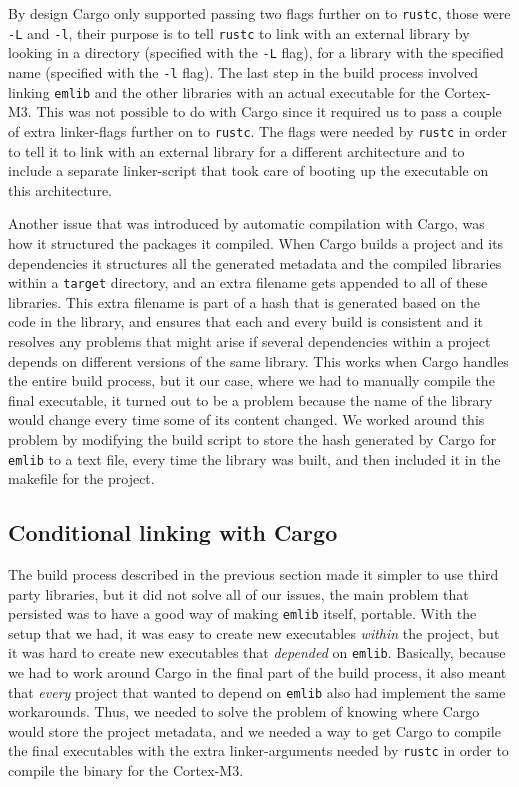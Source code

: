 By design Cargo only supported passing two flags further on to \texttt{rustc}, those were \texttt{-L} and \texttt{-l}, their purpose is to tell \texttt{rustc} to link with an external library by looking in a directory (specified with the \texttt{-L} flag), for a library with the specified name (specified with the \texttt{-l} flag).
The last step in the build process involved linking \texttt{emlib} and the other libraries with an actual executable for the Cortex-M3.
This was not possible to do with Cargo since it required us to pass a couple of extra linker-flags further on to \texttt{rustc}.
The flags were needed by \texttt{rustc} in order to tell it to link with an external library for a different architecture and to include a separate linker-script that took care of booting up the executable on this architecture.

Another issue that was introduced by automatic compilation with Cargo, was how it structured the packages it compiled.
When Cargo builds a project and its dependencies it structures all the generated metadata and the compiled libraries within a \texttt{target} directory, and an extra filename gets appended to all of these libraries.
This extra filename is part of a hash that is generated based on the code in the library, and ensures that each and every build is consistent and it resolves any problems that might arise if several dependencies within a project depends on different versions of the same library.
This works when Cargo handles the entire build process, but it our case, where we had to manually compile the final executable, it turned out to be a problem because the name of the library would change every time some of its content changed.
We worked around this problem by modifying the build script to store the hash generated by Cargo for \texttt{emlib} to a text file, every time the library was built, and then included it in the makefile for the project.

\subsection{Conditional linking with Cargo}

The build process described in the previous section made it simpler to use third party libraries, but it did not solve all of our issues, the main problem that persisted was to have a good way of making \texttt{emlib} itself, portable.
With the setup that we had, it was easy to create new executables \emph{within} the project, but it was hard to create new executables that \emph{depended} on \texttt{emlib}.
Basically, because we had to work around Cargo in the final part of the build process, it also meant that \emph{every} project that wanted to depend on \texttt{emlib} also had implement the same workarounds.
Thus, we needed to solve the problem of knowing where Cargo would store the project metadata, and we needed a way to get Cargo to compile the final executables with the extra linker-arguments needed by \texttt{rustc} in order to compile the binary for the Cortex-M3.

